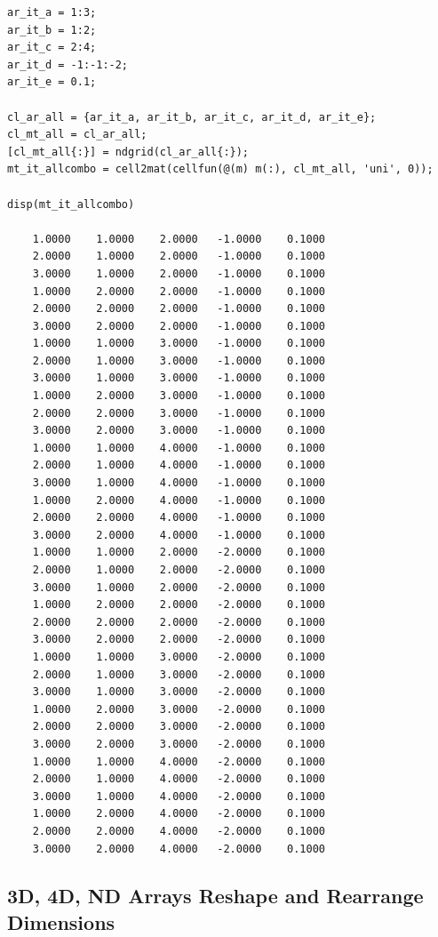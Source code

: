 \documentclass[
]{book}
\begin{document}
\begin{verbatim}
ar_it_a = 1:3;
ar_it_b = 1:2;
ar_it_c = 2:4;
ar_it_d = -1:-1:-2;
ar_it_e = 0.1;

cl_ar_all = {ar_it_a, ar_it_b, ar_it_c, ar_it_d, ar_it_e};
cl_mt_all = cl_ar_all;
[cl_mt_all{:}] = ndgrid(cl_ar_all{:});
mt_it_allcombo = cell2mat(cellfun(@(m) m(:), cl_mt_all, 'uni', 0));

disp(mt_it_allcombo)

    1.0000    1.0000    2.0000   -1.0000    0.1000
    2.0000    1.0000    2.0000   -1.0000    0.1000
    3.0000    1.0000    2.0000   -1.0000    0.1000
    1.0000    2.0000    2.0000   -1.0000    0.1000
    2.0000    2.0000    2.0000   -1.0000    0.1000
    3.0000    2.0000    2.0000   -1.0000    0.1000
    1.0000    1.0000    3.0000   -1.0000    0.1000
    2.0000    1.0000    3.0000   -1.0000    0.1000
    3.0000    1.0000    3.0000   -1.0000    0.1000
    1.0000    2.0000    3.0000   -1.0000    0.1000
    2.0000    2.0000    3.0000   -1.0000    0.1000
    3.0000    2.0000    3.0000   -1.0000    0.1000
    1.0000    1.0000    4.0000   -1.0000    0.1000
    2.0000    1.0000    4.0000   -1.0000    0.1000
    3.0000    1.0000    4.0000   -1.0000    0.1000
    1.0000    2.0000    4.0000   -1.0000    0.1000
    2.0000    2.0000    4.0000   -1.0000    0.1000
    3.0000    2.0000    4.0000   -1.0000    0.1000
    1.0000    1.0000    2.0000   -2.0000    0.1000
    2.0000    1.0000    2.0000   -2.0000    0.1000
    3.0000    1.0000    2.0000   -2.0000    0.1000
    1.0000    2.0000    2.0000   -2.0000    0.1000
    2.0000    2.0000    2.0000   -2.0000    0.1000
    3.0000    2.0000    2.0000   -2.0000    0.1000
    1.0000    1.0000    3.0000   -2.0000    0.1000
    2.0000    1.0000    3.0000   -2.0000    0.1000
    3.0000    1.0000    3.0000   -2.0000    0.1000
    1.0000    2.0000    3.0000   -2.0000    0.1000
    2.0000    2.0000    3.0000   -2.0000    0.1000
    3.0000    2.0000    3.0000   -2.0000    0.1000
    1.0000    1.0000    4.0000   -2.0000    0.1000
    2.0000    1.0000    4.0000   -2.0000    0.1000
    3.0000    1.0000    4.0000   -2.0000    0.1000
    1.0000    2.0000    4.0000   -2.0000    0.1000
    2.0000    2.0000    4.0000   -2.0000    0.1000
    3.0000    2.0000    4.0000   -2.0000    0.1000
\end{verbatim}

\hypertarget{d-4d-nd-arrays-reshape-and-rearrange-dimensions}{%
\subsection{3D, 4D, ND Arrays Reshape and Rearrange Dimensions}\label{d-4d-nd-arrays-reshape-and-rearrange-dimensions}}
\end{document}
